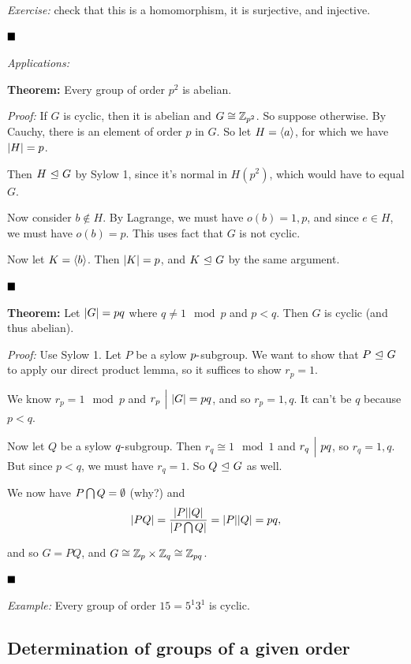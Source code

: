 \emph{Exercise:} check that this is a homomorphism, it is surjective,
and injective.

\(\qed\)

\emph{Applications:}

\textbf{Theorem:} Every group of order \(p^2\) is abelian.

\emph{Proof:} If \(G\) is cyclic, then it is abelian and
\(G \cong {\mathbb{Z}}_{p^2}\). So suppose otherwise. By Cauchy, there is an
element of order \(p\) in \(G\). So let \(H = \left\langle{a}\right\rangle\), for
which we have \({\left\lvert {H} \right\rvert} = p\).

Then \(H {~\trianglelefteq~} G\) by Sylow 1, since it's normal in \(H(p^2)\), which
would have to equal \(G\).

Now consider \(b\not\in H\). By Lagrange, we must have \(o(b) = 1, p\),
and since \(e\in H\), we must have \(o(b) = p\). This uses fact that
\(G\) is not cyclic.

Now let \(K = \left\langle{b}\right\rangle\). Then \({\left\lvert {K} \right\rvert} = p\), and
\(K {~\trianglelefteq~} G\) by the same argument.

\(\qed\)

\textbf{Theorem:} Let \({\left\lvert {G} \right\rvert} = pq\) where \(q\neq 1 \mod p\) and
\(p < q\). Then \(G\) is cyclic (and thus abelian).

\emph{Proof:} Use Sylow 1. Let \(P\) be a sylow \(p{\hbox{-}}\)subgroup. We
want to show that \(P {~\trianglelefteq~} G\) to apply our direct product lemma, so
it suffices to show \(r_p = 1\).

We know \(r_p = 1 \mod p\) and \(r_p {~\Bigm| ~} {\left\lvert {G} \right\rvert} = pq\), and so
\(r_p = 1,q\). It can't be \(q\) because \(p < q\).

Now let \(Q\) be a sylow \(q{\hbox{-}}\)subgroup. Then \(r_q \cong 1 \mod 1\)
and \(r_q {~\Bigm| ~} pq\), so \(r_q = 1, q\). But since \(p< q\), we must
have \(r_q = 1\). So \(Q {~\trianglelefteq~} G\) as well.

We now have \(P \bigcap Q = \emptyset\) (why?) and \[
{\left\lvert {PQ} \right\rvert} = \frac{{\left\lvert {P} \right\rvert} {\left\lvert {Q} \right\rvert}}{ {\left\lvert {P \bigcap Q} \right\rvert} } = {\left\lvert {P} \right\rvert} {\left\lvert {Q} \right\rvert} = pq,
\]

and so \(G = PQ\), and \(G \cong {\mathbb{Z}}_p \times {\mathbb{Z}}_q \cong {\mathbb{Z}}_{pq}\).

\(\qed\)

\emph{Example:} Every group of order \(15 = 5^1 3^1\) is cyclic.

\hypertarget{determination-of-groups-of-a-given-order}{%
\subsection{Determination of groups of a given
order}\label{determination-of-groups-of-a-given-order}}

